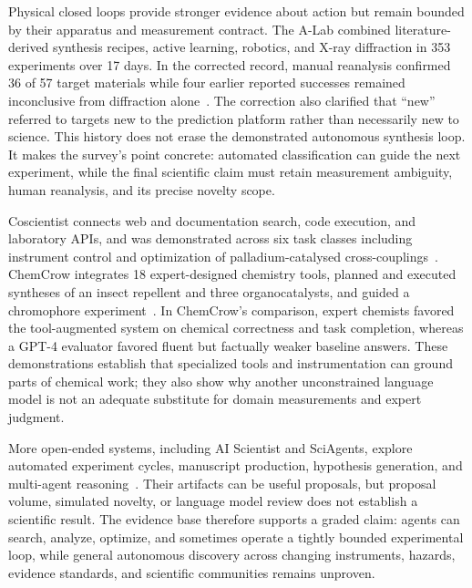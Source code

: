 Physical closed loops provide stronger evidence about action but remain bounded by their apparatus and measurement contract. The A-Lab combined literature-derived synthesis recipes, active learning, robotics, and X-ray diffraction in 353 experiments over 17 days. In the corrected record, manual reanalysis confirmed 36 of 57 target materials while four earlier reported successes remained inconclusive from diffraction alone~\cite{szymanski2023alab,szymanski2026alabcorrection}. The correction also clarified that ``new'' referred to targets new to the prediction platform rather than necessarily new to science. This history does not erase the demonstrated autonomous synthesis loop. It makes the survey's point concrete: automated classification can guide the next experiment, while the final scientific claim must retain measurement ambiguity, human reanalysis, and its precise novelty scope.

Coscientist connects web and documentation search, code execution, and laboratory APIs, and was demonstrated across six task classes including instrument control and optimization of palladium-catalysed cross-couplings~\cite{boiko2023coscientist}. ChemCrow integrates 18 expert-designed chemistry tools, planned and executed syntheses of an insect repellent and three organocatalysts, and guided a chromophore experiment~\cite{bran2024chemcrow}. In ChemCrow's comparison, expert chemists favored the tool-augmented system on chemical correctness and task completion, whereas a GPT-4 evaluator favored fluent but factually weaker baseline answers. These demonstrations establish that specialized tools and instrumentation can ground parts of chemical work; they also show why another unconstrained language model is not an adequate substitute for domain measurements and expert judgment.

More open-ended systems, including AI Scientist and SciAgents, explore automated experiment cycles, manuscript production, hypothesis generation, and multi-agent reasoning~\cite{lu2024aiscientist,ghafarollahi2024sciagents}. Their artifacts can be useful proposals, but proposal volume, simulated novelty, or language model review does not establish a scientific result. The evidence base therefore supports a graded claim: agents can search, analyze, optimize, and sometimes operate a tightly bounded experimental loop, while general autonomous discovery across changing instruments, hazards, evidence standards, and scientific communities remains unproven.

